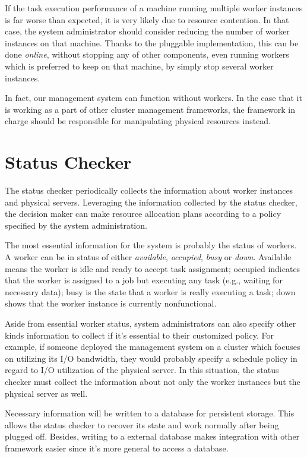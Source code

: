 {If the task execution performance of a machine running multiple worker
instances is far worse than expected, it is very likely due to resource
contention.
In that case, the system administrator should consider reducing the
number of worker instances on that machine.
Thanks to the pluggable implementation, this can be done \emph{online},
without stopping any of other components, even running workers which is
preferred to keep on that machine, by simply stop several worker
instances.

In fact, our management system can function without workers.
In the case that it is working as a part of other cluster management
frameworks, the framework in charge should be responsible for
manipulating physical resources instead.

\section{Status Checker}

The status checker periodically collects the information about worker
instances and physical servers.
Leveraging the information collected by the status checker, the decision
maker can make resource allocation plans according to a policy specified
by the system administration.

The most essential information for the system is probably the status of
workers.
A worker can be in status of either \emph{available}, \emph{occupied},
\emph{busy} or \emph{down}.
Available means the worker
is idle and ready to accept task assignment; occupied indicates that the
worker is assigned to a job but executing any task (e.g., waiting for
necessary data); busy is the state that a worker is really executing a
task; down shows that the worker instance is currently nonfunctional. 

Aside from essential worker status, system administrators can also
specify other kinds information to collect if it's essential to  their
customized policy.
For example, if someone deployed the management system on a cluster
which focuses on utilizing its I/O bandwidth, they would probably
specify a schedule policy in regard to I/O utilization of the physical
server.
In this situation, the status checker must collect the information about
not only the worker instances but the physical server as well.

Necessary information will be written to a database for persistent
storage.
This allows the status checker to recover its state and work normally
after being plugged off.
Besides, writing to a external database makes integration with other
framework easier since it's more general to access a database.

}
